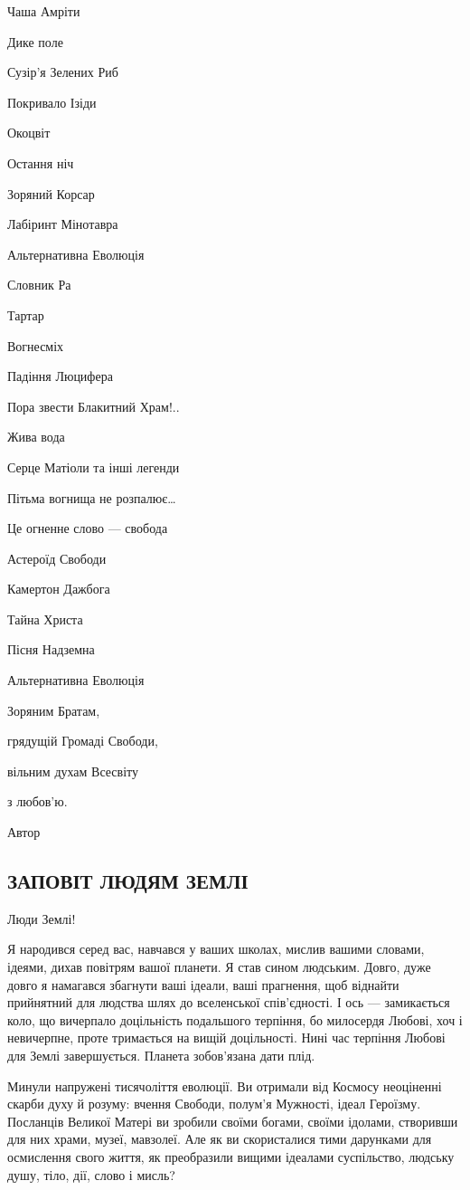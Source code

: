 Чаша Амріти

Дике поле

Сузір’я Зелених Риб

Покривало Ізіди

Окоцвіт

Остання ніч

Зоряний Корсар

Лабіринт Мінотавра

Альтернативна Еволюція

Словник Ра

Тартар

Вогнесміх

Падіння Люцифера

Пора звести Блакитний Храм!..

Жива вода

Серце Матіоли та інші легенди

Пітьма вогнища не розпалює…

Це огненне слово — свобода

Астероїд Свободи

Камертон Дажбога

Тайна Христа

Пісня Надземна

Альтернативна Еволюція

Зоряним Братам,

грядущій Громаді Свободи,

вільним духам Всесвіту

з любов’ю.

Автор

\subsection{ЗАПОВІТ ЛЮДЯМ ЗЕМЛІ}

Люди Землі!

Я народився серед вас, навчався у ваших школах, мислив вашими словами, ідеями,
дихав повітрям вашої планети. Я став сином людським. Довго, дуже довго я
намагався збагнути ваші ідеали, ваші прагнення, щоб віднайти прийнятний для
людства шлях до вселенської спів’єдності. І ось — замикається коло, що
вичерпало доцільність подальшого терпіння, бо милосердя Любові, хоч і
невичерпне, проте тримається на вищій доцільності. Нині час терпіння Любові для
Землі завершується. Планета зобов’язана дати плід.

Минули напружені тисячоліття еволюції. Ви отримали від Космосу неоціненні
скарби духу й розуму: вчення Свободи, полум’я Мужності, ідеал Героїзму.
Посланців Великої Матері ви зробили своїми богами, своїми ідолами, створивши
для них храми, музеї, мавзолеї. Але як ви скористалися тими дарунками для
осмислення свого життя, як преобразили вищими ідеалами суспільство, людську
душу, тіло, дії, слово і мисль?

